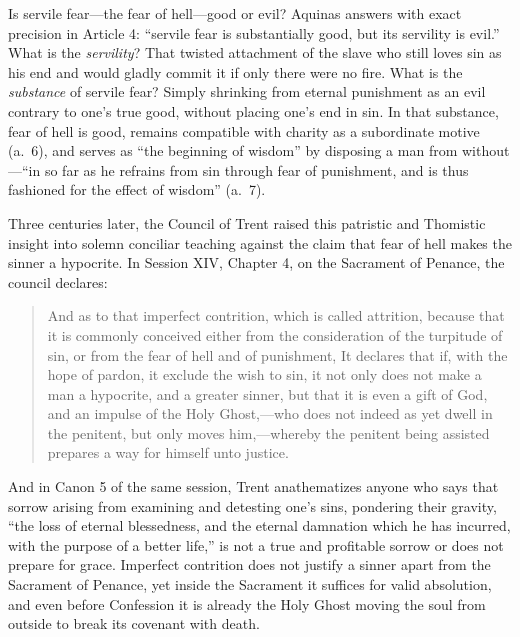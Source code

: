 Is servile fear---the fear of hell---good or evil? Aquinas answers with exact precision in Article 4: ``servile fear is substantially good, but its servility is evil.'' What is the \textit{servility}? That twisted attachment of the slave who still loves sin as his end and would gladly commit it if only there were no fire. What is the \textit{substance} of servile fear? Simply shrinking from eternal punishment as an evil contrary to one's true good, without placing one's end in sin. In that substance, fear of hell is good, remains compatible with charity as a subordinate motive (a.\ 6), and serves as ``the beginning of wisdom'' by disposing a man from without---``in so far as he refrains from sin through fear of punishment, and is thus fashioned for the effect of wisdom'' (a.\ 7).

Three centuries later, the Council of Trent raised this patristic and Thomistic insight into solemn conciliar teaching against the claim that fear of hell makes the sinner a hypocrite. In Session XIV, Chapter 4, on the Sacrament of Penance, the council declares:

\begin{quote}
And as to that imperfect contrition, which is called attrition, because that it is commonly conceived either from the consideration of the turpitude of sin, or from the fear of hell and of punishment, It declares that if, with the hope of pardon, it exclude the wish to sin, it not only does not make a man a hypocrite, and a greater sinner, but that it is even a gift of God, and an impulse of the Holy Ghost,---who does not indeed as yet dwell in the penitent, but only moves him,---whereby the penitent being assisted prepares a way for himself unto justice.
\end{quote}

And in Canon 5 of the same session, Trent anathematizes anyone who says that sorrow arising from examining and detesting one's sins, pondering their gravity, ``the loss of eternal blessedness, and the eternal damnation which he has incurred, with the purpose of a better life,'' is not a true and profitable sorrow or does not prepare for grace. Imperfect contrition does not justify a sinner apart from the Sacrament of Penance, yet inside the Sacrament it suffices for valid absolution, and even before Confession it is already the Holy Ghost moving the soul from outside to break its covenant with death.

